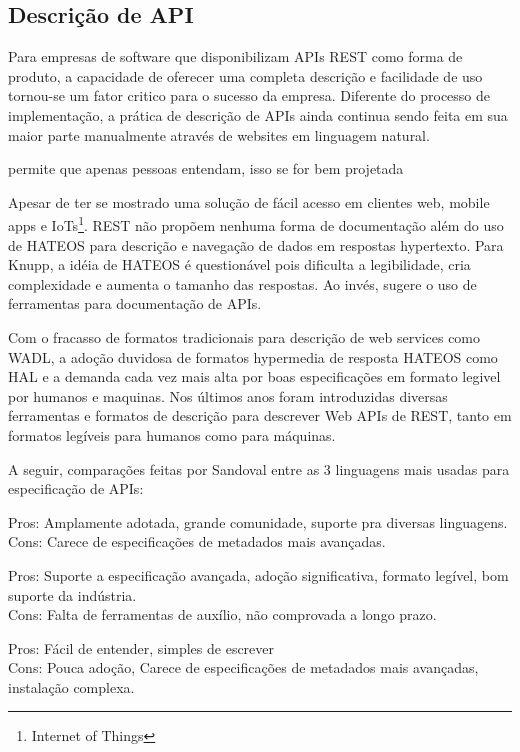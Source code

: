 \subsection[Descrição de API]{Descrição de API}



Para empresas de software que disponibilizam APIs REST como forma de produto, a capacidade de oferecer uma completa descrição e facilidade de uso tornou-se um fator critico para o sucesso da empresa. Diferente do processo de implementação, a prática de descrição de APIs ainda continua sendo feita em sua maior parte manualmente através de websites em linguagem natural. \cite{LuckyEtAl2016}

 permite que apenas pessoas entendam, isso se for bem projetada 
 
Apesar de ter se mostrado uma solução de fácil acesso em clientes web, mobile apps e IoTs\footnote{
  Internet of Things
}. REST não propõem nenhuma forma de documentação além do uso de HATEOS para descrição e navegação de dados em respostas hypertexto. Para Knupp, a idéia de HATEOS é questionável pois dificulta a legibilidade, cria complexidade e aumenta o tamanho das respostas. Ao invés, sugere o uso de ferramentas para documentação de APIs. \cite{Knupp2016}

Com o fracasso de formatos tradicionais para descrição de web services como WADL, a adoção duvidosa de formatos hypermedia de resposta HATEOS como HAL e a demanda cada vez mais alta por boas especificações em formato legivel por humanos e maquinas. Nos últimos anos foram introduzidas diversas ferramentas e formatos de descrição para descrever Web APIs de REST, tanto em formatos legíveis para humanos como para máquinas. \cite{LuckyEtAl2016}

A seguir, comparações feitas por Sandoval entre as 3 linguagens mais usadas para especificação de APIs: \cite{Sandoval2015}

\begin{description}[leftmargin=8em,style=nextline]
  \item[\textbf{OpenAPI} (Swagger)] Pros: Amplamente adotada, grande comunidade, suporte pra diversas linguagens. \\ Cons: Carece de especificações de metadados mais avançadas.
  \item[\textbf{RAML}] Pros: Suporte a especificação avançada, adoção significativa, formato legível, bom suporte da indústria. \\ Cons: Falta de ferramentas de auxílio, não comprovada a longo prazo.
  \item[\textbf{API Blueprint}] Pros: Fácil de entender, simples de escrever \\ Cons: Pouca adoção, Carece de especificações de metadados mais avançadas, instalação complexa.
\end{description}

